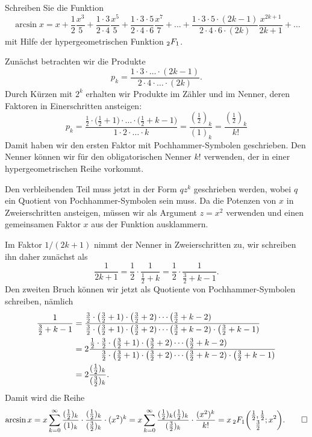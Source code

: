 Schreiben Sie die Funktion
\[
\arcsin x
=
x
+
\frac{1}{2} \frac{x^3}{5}
+
\frac{1\cdot 3}{2\cdot 4}\frac{x^5}{5}
+
\frac{1\cdot 3\cdot 5}{2\cdot 4\cdot 6}\frac{x^7}{7}
+
\dots
+
\frac{1\cdot 3\cdot 5\cdot (2k-1)}{2\cdot4\cdot 6\cdot (2k)}
\frac{x^{2k+1}}{2k+1}
+
\dots
\]
mit Hilfe der hypergeometrischen Funktion $\mathstrut_2F_1$.

\begin{loesung}
Zunächst betrachten wir die Produkte
\[
p_k
=
\frac{1\cdot 3\cdot \ldots \cdot (2k-1)}{2\cdot 4\cdot\ldots\cdot (2k)}.
\]
Durch Kürzen mit $2^k$ erhalten wir Produkte im Zähler und im Nenner, deren
Faktoren in Einerschritten ansteigen:
\[
p_k
=
\frac{
\frac12\cdot
\bigl(
\frac12+1\bigr)\cdot\ldots\cdot\bigl(\frac12+k-1\bigr)
}{
1\cdot 2\cdot \ldots \cdot k
}
=
\frac{(\frac12)_k}{(1)_k}
=
\frac{(\frac12)_k}{k!}
\]
Damit haben wir den ersten Faktor mit Pochhammer-Symbolen geschrieben.
Den Nenner können wir für den obligatorischen Nenner $k!$ verwenden,
der in einer hypergeometrischen Reihe vorkommt.

Den verbleibenden Teil muss jetzt in der Form $qz^k$ geschrieben werden,
wobei $q$ ein Quotient von Pochhammer-Symbolen sein muss.
Da die Potenzen von $x$ in Zweierschritten ansteigen, müssen wir als
Argument $z=x^2$ verwenden und einen gemeinsamen Faktor $x$ aus der
Funktion ausklammern.

Im Faktor $1/(2k+1)$ nimmt der Nenner in Zweierschritten zu, wir schreiben
ihn daher zunächst als
\[
\frac{1}{2k+1}
=
\frac{1}{2}\cdot \frac{1}{\frac12+k}
=
\frac{1}{2}\cdot\frac{1}{\frac32+k-1}.
\]
Den zweiten Bruch können wir jetzt als Quotiente von Pochhammer-Symbolen
schreiben, nämlich
\begin{align*}
\frac{1}{\frac32+k-1}
&=
\frac{
\frac32
\cdot
\bigl(\frac32+1)
\cdot
\bigl(\frac32+2)
\cdots
\bigl(\frac32+k-2)
\phantom{
\mathstrut
\cdot
\bigl(\frac32+k-1)
}
}{
\frac32
\cdot
\bigl(\frac32+1)
\cdot
\bigl(\frac32+2)
\cdots
\bigl(\frac32+k-2)
\cdot
\bigl(\frac32+k-1)
}
\\
&=
2
\frac{
\frac12
\cdot
\frac32
\cdot
\bigl(\frac32+1)
\cdot
\bigl(\frac32+2)
\cdots
\bigl(\frac32+k-2)
\phantom{
\mathstrut
\cdot
\bigl(\frac32+k-1)
}
}{
\phantom{
\frac12
\cdot
\mathstrut
}
\frac32
\cdot
\bigl(\frac32+1)
\cdot
\bigl(\frac32+2)
\cdots
\bigl(\frac32+k-2)
\cdot
\bigl(\frac32+k-1)
}
\\
&=
2\frac{(\frac12)_k}{(\frac32)_k}.
\end{align*}
Damit wird die Reihe
\[
\arcsin x
=
x
\sum_{k=0}^\infty
\frac{(\frac12)_k}{(1)_k}
\cdot
\frac{(\frac12)_k}{(\frac32)_k}
\cdot
(x^2)^k
=
x
\sum_{k=0}^\infty
\frac{(\frac12)_k(\frac12)_k}{(\frac32)_k}
\cdot
\frac{(x^2)^k}{k!}
=
x\,
\mathstrut_2F_1\biggl(
\begin{matrix}
\frac12,\frac12\\ \frac32
\end{matrix}
;x^2
\biggr).
\qedhere
\]
\end{loesung}
